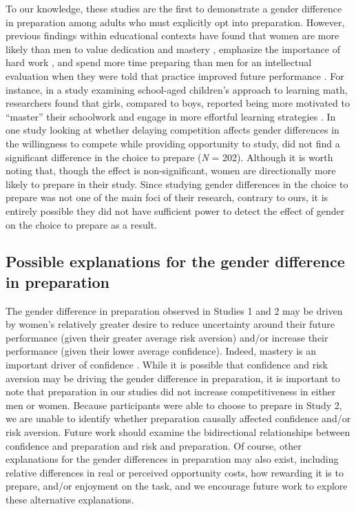 \documentclass[a4paper, nobind]{templates/ociamthesis}
\begin{document}
To our knowledge, these studies are the first to demonstrate a gender difference in preparation among adults who must explicitly opt into preparation. However, previous findings within educational contexts have found that women are more likely than men to value dedication and mastery \autocite{Leslie2015,Kenney-Benson2006}, emphasize the importance of hard work \autocite{Mccrea2008,Hirt2009,Mccrea2008a}, and spend more time preparing than men for an intellectual evaluation when they were told that practice improved future performance \autocite{Kimble2005}. For instance, in a study examining school-aged children's approach to learning math, researchers found that girls, compared to boys, reported being more motivated to ``master'' their schoolwork and engage in more effortful learning strategies \autocite{Kenney-Benson2006}. In one study looking at whether delaying competition affects gender differences in the willingness to compete while providing opportunity to study, \textcite{Charness2021} did not find a significant difference in the choice to prepare (\emph{N} = 202). Although it is worth noting that, though the effect is non-significant, women are directionally more likely to prepare in their study. Since studying gender differences in the choice to prepare was not one of the main foci of their research, contrary to ours, it is entirely possible they did not have sufficient power to detect the effect of gender on the choice to prepare as a result.

\hypertarget{possible-explanations-for-the-gender-difference-in-preparation}{%
\subsection{Possible explanations for the gender difference in preparation}\label{possible-explanations-for-the-gender-difference-in-preparation}}

The gender difference in preparation observed in Studies 1 and 2 may be driven by women's relatively greater desire to reduce uncertainty around their future performance (given their greater average risk aversion) and/or increase their performance (given their lower average confidence). Indeed, mastery is an important driver of confidence \autocites[for review, see][]{Gist1992,Usher2008}. While it is possible that confidence and risk aversion may be driving the gender difference in preparation, it is important to note that preparation in our studies did not increase competitiveness in either men or women. Because participants were able to choose to prepare in Study 2, we are unable to identify whether preparation causally affected confidence and/or risk aversion. Future work should examine the bidirectional relationships between confidence and preparation and risk and preparation. Of course, other explanations for the gender differences in preparation may also exist, including relative differences in real or perceived opportunity costs, how rewarding it is to prepare, and/or enjoyment on the task, and we encourage future work to explore these alternative explanations.
\end{document}
